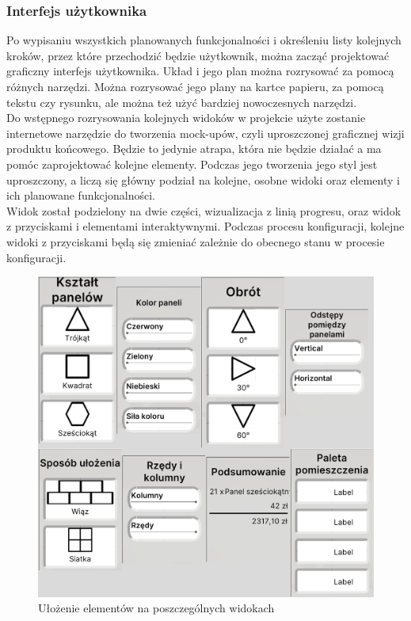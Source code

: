 \documentclass{article} %
\begin{document}
        \subsubsection{Interfejs użytkownika}
            Po wypisaniu wszystkich planowanych funkcjonalności i określeniu listy kolejnych kroków, przez które przechodzić będzie użytkownik, można zacząć projektować graficzny interfejs użytkownika. Układ i jego plan można rozrysować za pomocą różnych narzędzi. Można rozrysować jego plany na kartce papieru, za pomocą tekstu czy rysunku, ale można też użyć bardziej nowoczesnych narzędzi.
            \\
            
            Do wstępnego rozrysowania kolejnych widoków w projekcie użyte zostanie internetowe narzędzie do tworzenia mock-upów, czyli uproszczonej graficznej wizji produktu końcowego. Będzie to jedynie atrapa, która nie będzie działać a ma pomóc zaprojektować kolejne elementy. Podczas jego tworzenia jego styl jest uproszczony, a liczą się główny podział na kolejne, osobne widoki oraz elementy i ich planowane funkcjonalności.
            \\
            
            Widok został podzielony na dwie części, wizualizacja z linią progresu, oraz widok z przyciskami i elementami interaktywnymi. Podczas procesu konfiguracji, kolejne widoki z przyciskami będą się zmieniać zależnie do obecnego stanu w procesie konfiguracji. 
            \\
            
            \begin{figure}[h]
            \centering
            \includegraphics[bb=0 0 1103 1053,keepaspectratio=true, scale=0.3]{images/screenshots/work/ui-montage.png}
            \caption{Ułożenie elementów na poszczególnych widokach}
            \end{figure}
\end{document}
